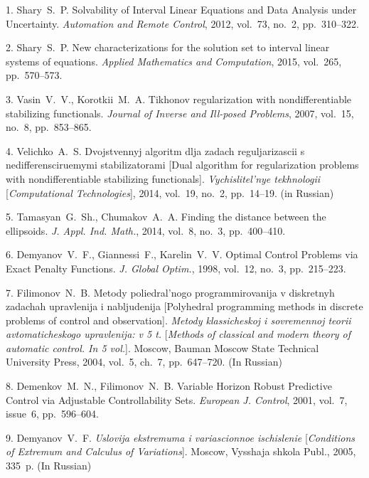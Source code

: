 {\footnotesize

\vskip 3mm


\vskip 2mm


1.    Shary~S.~P. Solvability of Interval Linear Equations and
Data Analysis under Un\-cer\-tain\-ty. \textit{Automation and
Remote Control}, 2012, vol.~73, no.~2, pp.~310--322.

2. Shary~S.~P.  New characterizations for the solution set to
interval linear systems of equations.  \textit{Applied Mathematics
and Computation}, 2015, vol.~265, pp.~570--573.

3. Vasin~V.~V., Korotkii~M.~A. Tikhonov regularization with
nondifferentiable stabilizing functionals. \textit{Journal of
Inverse and Ill-posed Problems},  2007, vol.~15, no.~8,
pp.~853--865.

4. Velichko~A.~S. Dvojstvennyj algoritm dlja zadach
reguljarizascii s nedifferensci\-rue\-my\-mi stabilizatorami [Dual
algorithm for regularization problems with nondifferentiable
stabilizing functionals]. \textit{Vychislitel'nye tekhnologii}
[\textit{Computational Technologies}], 2014, vol.~19, no.~2,
pp.~14--19. (in Russian)

5.  Tamasyan~G.~Sh., Chumakov~A.~A.    Finding the distance
between the ellipsoids.     \textit{J. Appl. Ind. Math.},
2014,  vol.~8, no.~3, pp.~400--410.

6. Demyanov~V.~F., Giannessi~F., Karelin~V.~V. Optimal Control
Problems via Exact Penalty Functions. \textit{J. Global Optim.},
 1998, vol.~12, no.~3, pp.~215--223.

7. Filimonov~N.~B. Metody poliedral'nogo programmirovanija v
diskretnyh zadachah upravlenija i nabljudenija [Polyhedral
programming methods in discrete problems of control and
observation]. \textit{Metody klassicheskoj i sovremennoj teorii
avtomaticheskogo upravlenija: v 5 t.} [\textit{Methods of
classical and modern theory of automatic control. In 5 vol.}].
 Moscow, Bauman Moscow State Technical University
Press, 2004, vol.~5, ch.~7, pp.~647--720. (In Russian)

8.  Demenkov~M.~N.,  Filimonov~N.~B.  Variable Horizon Robust
Predictive Control via Adjustable Controllability Sets.
\textit{European J. Control},  2001, vol.~7, issue~6,
pp.~596--604.

9. Demyanov~V.~F. \textit{Uslovija ekstremuma i variascionnoe
ischislenie} [\textit{Conditions of Extremum and Calculus of
Variations}]. Moscow, Vysshaja shkola Publ., 2005, 335~p. (In
Russian)

}
